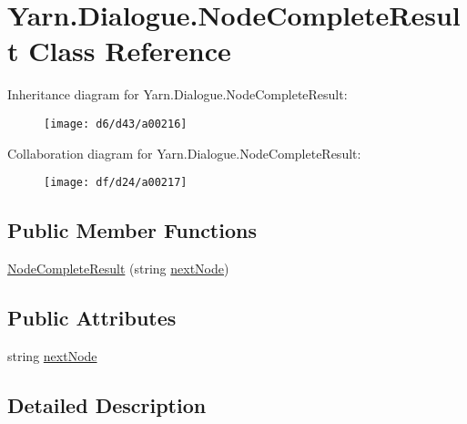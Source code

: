 \hypertarget{a00055}{\section{Yarn.\-Dialogue.\-Node\-Complete\-Result Class Reference}
\label{a00055}
}


Inheritance diagram for Yarn.\-Dialogue.\-Node\-Complete\-Result\-:
\nopagebreak
\begin{figure}[H]
\begin{center}
\leavevmode
\texttt{[image: d6/d43/a00216]}
\end{center}
\end{figure}


Collaboration diagram for Yarn.\-Dialogue.\-Node\-Complete\-Result\-:
\nopagebreak
\begin{figure}[H]
\begin{center}
\leavevmode
\texttt{[image: df/d24/a00217]}
\end{center}
\end{figure}
\subsection*{Public Member Functions}
\begin{DoxyCompactItemize}
\item 
\hyperlink{a00055_a88c81469a69987c05aa92780c5a5c1f9}{Node\-Complete\-Result} (string \hyperlink{a00055_ad48b37b51066b94cd48c58626ac0e774}{next\-Node})
\end{DoxyCompactItemize}
\subsection*{Public Attributes}
\begin{DoxyCompactItemize}
\item 
string \hyperlink{a00055_ad48b37b51066b94cd48c58626ac0e774}{next\-Node}
\end{DoxyCompactItemize}


\subsection{Detailed Description}


